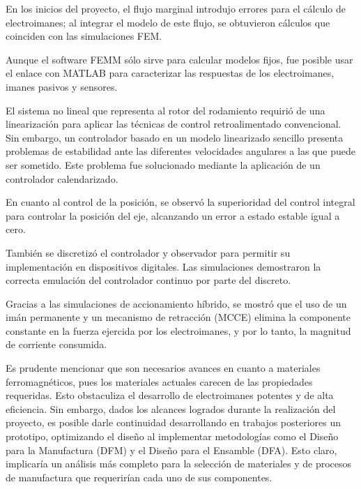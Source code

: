 En los inicios del proyecto, el flujo marginal introdujo errores para el c\'alculo de electroimanes; al integrar el modelo de este flujo, se obtuvieron c\'alculos que coinciden con las simulaciones FEM.

Aunque el software FEMM s\'olo sirve para calcular modelos fijos, fue posible usar el enlace con MATLAB para caracterizar las respuestas de los electroimanes, imanes pasivos y sensores.

El sistema no lineal que representa al rotor del rodamiento requiri\'o de una linearizaci\'on para aplicar las t\'ecnicas de control retroalimentado convencional. Sin embargo, un controlador basado en un modelo linearizado sencillo presenta problemas de estabilidad ante las diferentes velocidades angulares a las que puede ser sometido. Este problema fue solucionado mediante la aplicaci\'on de un controlador calendarizado.

En cuanto al control de la posici\'on, se observ\'o la superioridad del control integral para controlar la posici\'on del eje, alcanzando un error a estado estable igual a cero.

Tambi\'en se discretiz\'o el controlador y observador para permitir su implementaci\'on en dispositivos digitales. Las simulaciones demostraron la correcta emulaci\'on del controlador continuo por parte del discreto.

Gracias a las simulaciones de accionamiento h\'ibrido, se mostr\'o que el uso de un im\'an permanente y un mecanismo de retracci\'on (MCCE) elimina la componente constante en la fuerza ejercida por los electroimanes, y por lo tanto, la magnitud de corriente consumida.

Es prudente mencionar que son necesarios avances en cuanto a materiales ferromagn\'eticos, pues los materiales actuales carecen de las propiedades requeridas. Esto obstaculiza el desarrollo de electroimanes potentes y de alta eficiencia. Sin embargo, dados los alcances logrados durante la realizaci\'on del proyecto, es posible darle continuidad desarrollando en trabajos posteriores un prototipo, optimizando el dise\~no al implementar metodolog\'ias como el Dise\~no para la Manufactura (DFM) y el Dise\~no para el Ensamble (DFA). Esto claro, implicar\'ia un an\'alisis m\'as completo para la selecci\'on de materiales y de procesos de manufactura que requerir\'ian cada uno de sus componentes. 